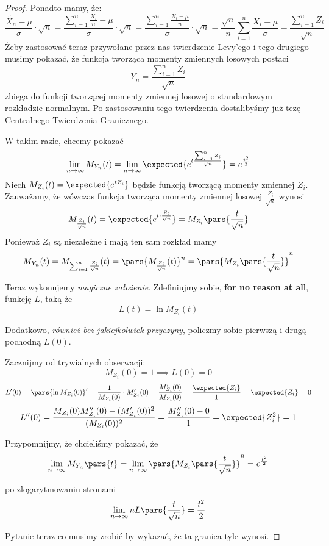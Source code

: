 \begin{proof}
	Ponadto mamy, że:
	\[
		\frac{\widetilde{X_n} - \mu}{\sigma} \cdot \sqrt{n} 
		= \frac{\sum_{i=1}^n \frac{X_i}{n} - \mu}{\sigma} \cdot \sqrt{n} 
		= \frac{\sum_{i=1}^n \frac{X_i - \mu}{n}}{\sigma} \cdot \sqrt{n} 
		= \frac{\sqrt{n}}{n}\sum_{i=1}^{n}\frac{X_i-\mu}{\sigma} 
		= \frac{\sum_{i=1}^nZ_i}{\sqrt{n}}
	\]
	Żeby zastosować teraz przywołane przez nas twierdzenie Levy'ego i tego drugiego musimy pokazać, że funkcja tworząca momenty zmiennych losowych postaci
	\[
		Y_n = \frac{\sum_{i=1}^nZ_i}{\sqrt{n}}
	\]
	zbiega do funkcji tworzącej momenty zmiennej losowej o standardowym rozkładzie normalnym. Po zastosowaniu tego twierdzenia dostalibyśmy już tezę Centralnego Twierdzenia Granicznego.

	W takim razie, chcemy pokazać
	\[
		\lim_{n \to \infty} M_{Y_n}(t) = \lim_{n \to \infty}\expected{e^{t\frac{\sum_{i=1}^nZ_i}{\sqrt{n}}}} = e^{\frac{t^2}{2}}
	\]
	Niech \( M_{Z_i}(t) = \expected{e^{tZ_i}} \) będzie funkcją tworzącą momenty zmiennej \(Z_i\).  Zauważamy, że wówczas funkcja tworząca momenty zmiennej losowej \( \frac{Z_i}{\sqrt{n}}\) wynosi
	\[
		M_{\frac{Z_i}{\sqrt{n}}} (t) = \expected{e^{t \cdot \frac{Z_i}{\sqrt{n}}}} = M_{Z_i} \pars{\frac{t}{\sqrt{n}}}
	\]
	Ponieważ \( Z_i\) są niezależne i mają ten sam rozkład mamy
	\[
		M_{Y_n}(t) = M_{\sum_{i=1}^{n} \frac{Z_i}{\sqrt{n}}} (t) = \pars{M_{\frac{Z_i}{\sqrt{n}}}(t)}^n = \pars{M_{Z_i}\pars{\frac{t}{\sqrt{n}}}}^n
	\]

	Teraz wykonujemy \textit{magiczne założenie}. Zdefiniujmy sobie, \textbf{for no reason at all}, funkcję \(L\), taką że
	\[
		L(t) = \ln M_{Z_i}(t)
	\]

	Dodatkowo, \textit{również bez jakiejkolwiek przyczyny}, policzmy sobie pierwszą i drugą pochodną \(L(0)\).

	Zacznijmy od trywialnych obserwacji:
	\[
		M_{Z_i}(0) = 1 \implies L(0) = 0
	\]
	\[
		L'(0) = \pars{\ln M_{Z_i}(0)}' = \frac{1}{M_{Z_i}(0)} \cdot M'_{Z_i}(0) = \frac{M_{Z_i}'(0)}{M_{Z_i}(0)} = \frac{\expected{Z_i}}{1} = \expected{Z_i} = 0
	\]
	\[
		L''(0) = \frac{M_{Z_i}(0)M_{Z_i}''(0) - (M_{Z_i}'(0))^2}{(M_{Z_i}(0))^2} = \frac{M_{Z_i}''(0) - 0}{1} = \expected{Z_i^2} = 1
	\]

	Przypomnijmy, że chcieliśmy pokazać, że
	\[
		\lim_{n\to\infty}M_{Y_n}\pars{t} = \lim_{n \to \infty } \pars{M_{Z_i}\pars{\frac{t}{\sqrt{n}}}}^n = e^{\frac{t^2}{2}}
	\]
	
	po zlogarytmowaniu stronami
	\[
		\lim_{n \to \infty} nL\pars{\frac{t}{\sqrt{n}}} = \frac{t^2}{2}
	\]

	Pytanie teraz co musimy zrobić by wykazać, że ta granica tyle wynosi.


\end{proof}
